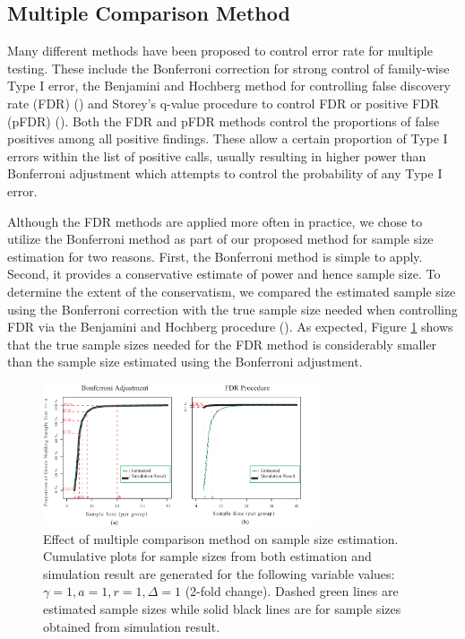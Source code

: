 \documentclass{bioinfo}
\begin{document}
\subsection{Multiple Comparison Method}

Many different methods have been proposed to control error rate for
multiple testing.  These include the Bonferroni correction for
strong control of family-wise Type I error, the Benjamini and
Hochberg method for controlling false discovery rate (FDR)
(\citealp{Benjamini95}) and Storey's q-value procedure to control
FDR or positive FDR (pFDR) (\citealp{Storey02}).  Both the FDR and
pFDR methods control the proportions of false positives among all
positive findings.  These allow a certain proportion of Type I
errors within the list of positive calls, usually resulting in
higher power than Bonferroni adjustment which attempts to control
the probability of any Type I error.

Although the FDR methods are applied more often in practice, we
chose to utilize the Bonferroni method as part of our proposed
method for sample size estimation for two reasons. First, the
Bonferroni method is simple to apply.  Second, it provides a
conservative estimate of power and hence sample size.  To determine
the extent of the conservatism, we compared the estimated sample
size using the Bonferroni correction with the true sample size
needed when controlling FDR via the Benjamini and Hochberg procedure
(\citealp{Benjamini95}). As expected, Figure \ref{fig:ResMtd} shows
that the true sample sizes needed for the FDR method is considerably
smaller than the sample size estimated using the Bonferroni
adjustment.

\begin{figure}[h]
  \centerline{\includegraphics*[width=3.2in]{ResMtd.pdf}}
  \caption[Effect of multiple comparison method on sample size
    estimation] {Effect of multiple comparison method on sample size
    estimation.  Cumulative plots for sample sizes from both
    estimation and simulation result are generated for the following
    variable values: $\gamma = 1, a = 1, r = 1, \Delta = 1$ (2-fold
    change). Dashed green lines are estimated sample sizes while solid
    black lines are for sample sizes obtained from simulation result.}
  \label{fig:ResMtd}
\end{figure}
\end{document}
